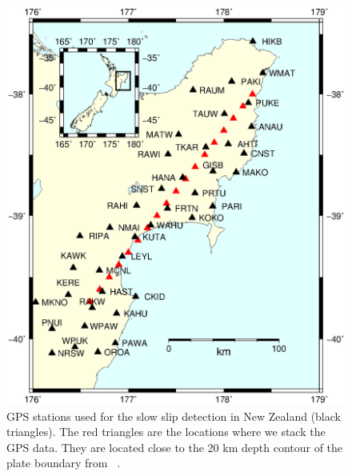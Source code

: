 \documentclass{article}
\begin{document}
\begin{figure}
\noindent\includegraphics[width=\textwidth, trim={0cm 0cm 0cm 0cm},clip]{figures/map_GPS_stations_NZ.eps}
\caption{GPS stations used for the slow slip detection in New Zealand (black triangles). The red triangles are the locations where we stack the GPS data. They are located close to the 20 km depth contour of the plate boundary from ~\citet{WIL_2013}.}
\label{pngfiguresample}
\end{figure}
\end{document}

